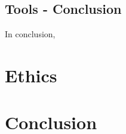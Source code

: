 \documentclass[11pt]{article}
\begin{document}
\subsection{Tools - Conclusion}
In conclusion, 



\section{Ethics}
\label{sec:Ethics}




\section{Conclusion}
\label{sec:Conclusion}

%

 
\end{document}
